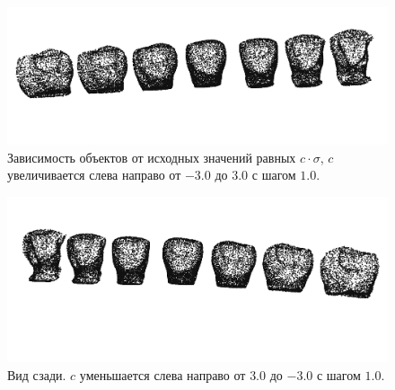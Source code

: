 \begin{figure}[h]
\includegraphics[width=1\linewidth]{images/snapshot_gen_var00.png}
\caption{Зависимость объектов от исходных значений равных $c \cdot \sigma$, $c$ увеличивается слева направо от $-3.0$ до $3.0$ с шагом $1.0$.}
\label{fig:c_l_3}
\end{figure}

\begin{figure}[h]
\includegraphics[width=1\linewidth]{images/snapshot_gen_var02.png}
\caption{Вид сзади. $c$ уменьшается слева направо от $3.0$ до $-3.0$ с шагом $1.0$.}
\label{fig:c_l_4}
\end{figure}


